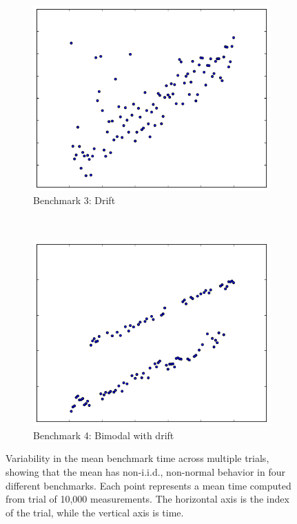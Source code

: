 \documentclass[conference]{IEEEtran}
\begin{document}
\begin{figure}
\begin{subfigure}{0.22\textwidth}
    \centering
    \includegraphics[width=\textwidth]{figures/fig1/drift_manyallocs_slow}
    \caption{Benchmark 3: Drift}
\end{subfigure}
~
\begin{subfigure}{0.22\textwidth}
    \centering
    \includegraphics[width=\textwidth]{figures/fig1/bimodal_drift_sumindex}
    \caption{Benchmark 4: Bimodal with drift}
\end{subfigure}
\caption{Variability in the mean benchmark time across multiple trials, showing
that the mean has non-i.i.d., non-normal behavior in four different benchmarks.
Each point represents a mean time computed from trial of 10,000 measurements.
The horizontal axis is the index of the trial, while the vertical axis is time.}
\label{fig:meandistributions}
\vspace{-0.42cm} %
\end{figure}
\end{document}
